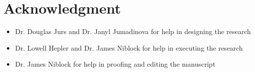 \chapter*{Acknowledgment}
\label{ch:acknowledgement}

\begin{itemize}
	\item Dr. Douglas Jurs and Dr. Janyl Jumadinova for help in designing the research
	\item Dr. Lowell Hepler and Dr. James Niblock for help in executing the research
	\item Dr. James Niblock for help in proofing and editing the manuscript 
\end{itemize}